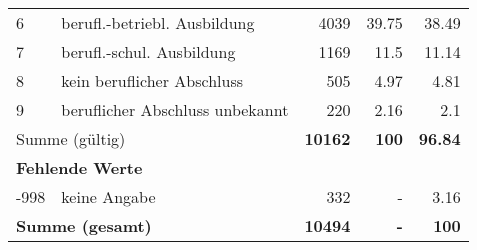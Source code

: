 \begin{longtable}{lXrrr}
     6 &
     \multicolumn{1}{X}{ berufl.-betriebl. Ausbildung   } &


       \num{4039} &
       \num[round-mode=places,round-precision=2]{39.75} &
         \num[round-mode=places,round-precision=2]{38.49} \\

     7 &
     \multicolumn{1}{X}{ berufl.-schul. Ausbildung   } &


       \num{1169} &
       \num[round-mode=places,round-precision=2]{11.5} &
         \num[round-mode=places,round-precision=2]{11.14} \\

     8 &
     \multicolumn{1}{X}{ kein beruflicher Abschluss   } &


       \num{505} &
       \num[round-mode=places,round-precision=2]{4.97} &
         \num[round-mode=places,round-precision=2]{4.81} \\

     9 &
     \multicolumn{1}{X}{ beruflicher Abschluss unbekannt   } &


       \num{220} &
       \num[round-mode=places,round-precision=2]{2.16} &
         \num[round-mode=places,round-precision=2]{2.1} \\
     \midrule
     \multicolumn{2}{l}{Summe (gültig)} &
       \textbf{\num{10162}} &
     \textbf{\num{100}} &
       \textbf{\num[round-mode=places,round-precision=2]{96.84}} \\
     \multicolumn{5}{l}{\textbf{Fehlende Werte}}\\
       -998 &
       keine Angabe &
         \num{332} &
        - &
         \num[round-mode=places,round-precision=2]{3.16} \\
     \midrule
     \multicolumn{2}{l}{\textbf{Summe (gesamt)}} &
          \textbf{\num{10494}} &
        \textbf{-} &
        \textbf{\num{100}} \\
     \bottomrule
     \end{longtable}
     
